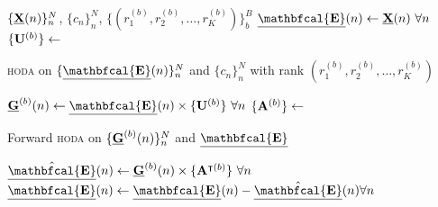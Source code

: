\begin{algorithmic}[1]
  \Require $\{\underline{\mathbf{X}}(n)\}_n^N$, $\{c_n\}_n^N$,
  $\{(r_1^{(b)},r_2^{(b)},\ldots,r_K^{(b)})\}_b^B$
  \State $\ten{\mathbfcal{E}}(n)\gets\ten{X}(n)\ \forall n$
  \State $\{\mathbf{U}^{(b)}\}\gets$ \parbox[t]{5cm}{%
    \raggedright
    \textsc{hoda} on $\{\ten{\mathbfcal{E}}(n)\}_n^N$ and
    $\{c_n\}_n^N$ with rank $(r_1^{(b)},r_2^{(b)},\ldots,r_K^{(b)})$
  }
  \State $\ten{G}^{(b)}(n)\gets\ten{\mathbfcal{E}}(n)\mmpri{\mat{U}^{(b)}}\
  \forall n$
  \State $\{\mathbf{A}^{(b)}\}\gets$ \parbox[t]{5cm}{Forward \textsc{hoda} on
  $\{\underline{\mathbf{G}}^{(b)}(n)\}_n^N$ and $\ten{\mathbfcal{E}}$}
  \State
  $\hat{\ten{\mathbfcal{E}}}(n)\gets\ten{G}^{(b)}(n)\mmpri{\mat{A}^{\intercal(b)}}\
  \forall n$
  \State
  $\ten{\mathbfcal{E}}(n)\gets \ten{\mathbfcal{E}}(n) - \hat{\ten{\mathbfcal{E}}}(n) \forall n$

  \EndFor
\end{algorithmic}
